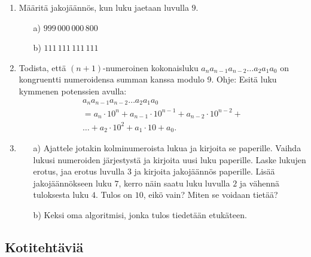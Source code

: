 \begin{enumerate}
\item
Määritä jakojäännös, kun luku jaetaan luvulla $9$.
\begin{itemize}
\item[a)] $999\, 000\, 000\, 800$
\item[b)] $111\, 111\, 111\, 111$
\end{itemize}

\item
Todista, että $(n+1)$-numeroinen kokonaisluku $a_na_{n-1}a_{n-2}\ldots a_2a_1a_0$ on kongruentti numeroidensa summan kanssa modulo 9. Ohje: Esitä luku kymmenen potenssien avulla:
\begin{multline*}
a_na_{n-1}a_{n-2}\ldots a_2a_1a_0\\ = a_n \cdot 10^n + a_{n-1}\cdot 10^{n-1} + a_{n-2} \cdot 10^{n-2} + \\
\ldots + a_2 \cdot 10^2 + a_1 \cdot 10 + a_0.
\end{multline*}

\item
\begin{itemize}
\item[a)] Ajattele jotakin kolminumeroista lukua ja kirjoita se paperille. Vaihda lukusi numeroiden järjestystä ja kirjoita uusi luku paperille. Laske lukujen erotus, jaa erotus luvulla $3$ ja kirjoita jakojäännös paperille. Lisää jakojäännökseen luku $7$, kerro näin saatu luku luvulla $2$ ja vähennä tuloksesta luku $4$. Tulos on $10$, eikö vain? Miten se voidaan tietää?
\item[b)] Keksi oma algoritmisi, jonka tulos tiedetään etukäteen.
\end{itemize}

\end{enumerate}

\subsection*{Kotitehtäviä}

